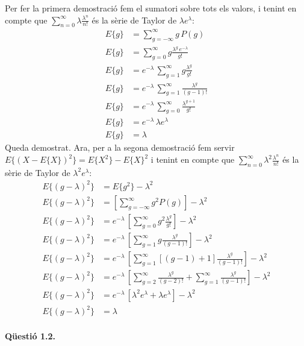 \documentclass[catalan]{scrartcl}
\begin{document}
Per fer la primera demostració fem el sumatori sobre tots els valors,
i tenint en compte que $\sum^{\infty}_{n=0} \lambda \frac{\lambda^n}{n!}$
és la sèrie de Taylor de $\lambda e^\lambda$:
%
\begin{align}
  E\{g\} &= \sum^{\infty}_{g=-\infty} g \, P(g)
\\
  E\{g\} &= \sum^{\infty}_{g=0} g \frac{\lambda^g \, e^{-\lambda} }{g!}
\\
  E\{g\} &= e^{-\lambda} \, \sum^{\infty}_{g=1} g \frac{\lambda^g }{g!}
\\
  E\{g\} &= e^{-\lambda} \, \sum^{\infty}_{g=1} \frac{\lambda^g }{(g-1)!}
\\
  E\{g\} &= e^{-\lambda} \, \sum^{\infty}_{g=0} \frac{\lambda^{g+1} }{g!}
\\
  E\{g\} &= e^{-\lambda} \, \lambda e^\lambda
\\
  E\{g\} &= \lambda
\end{align}
%
Queda demostrat. Ara, per a la segona demostració fem servir
$E\{(X - E\{X\})^2\} = E\{X^2\} - E\{X\}^2$ i tenint en compte que
$\sum^{\infty}_{n=0} \lambda^2 \frac{\lambda^n}{n!}$ és la sèrie de Taylor
de $\lambda^2 e^\lambda$:
%
\begin{align}
  E\{(g - \lambda)^2\} &= E\{ g^2 \} - \lambda^2
\\
  E\{(g - \lambda)^2\} &= \left[ \sum^\infty_{g=-\infty} g^2
    P(g) \right] - \lambda^2
\\
  E\{(g - \lambda)^2\} &= e^{-\lambda} \, \left[ \sum^\infty_{g=0} g^2
    \frac{\lambda^g }{g!} \right] - \lambda^2
\\
  E\{(g - \lambda)^2\} &= e^{-\lambda} \, \left[ \sum^\infty_{g=1} g
    \frac{\lambda^g }{(g-1)!} \right] - \lambda^2
%
\\
  E\{(g - \lambda)^2\} &= e^{-\lambda} \, \left[ \sum^\infty_{g=1} [(g-1) + 1]
    \frac{\lambda^g }{(g-1)!} \right] - \lambda^2
\\
  E\{(g - \lambda)^2\} &= e^{-\lambda} \, \left[ \sum^\infty_{g=2}
    \frac{\lambda^g }{(g-2)!} +
    \sum^\infty_{g=1} \frac{\lambda^g }{(g-1)!} \right] - \lambda^2
\\
  E\{(g - \lambda)^2\} &= e^{-\lambda} \, \left[ \lambda^2 e^\lambda +
    \lambda e^\lambda \right] - \lambda^2
\\
  E\{(g - \lambda)^2\} &= \lambda
%
\end{align}

\paragraph{Qüestió 1.2.}
\end{document}
